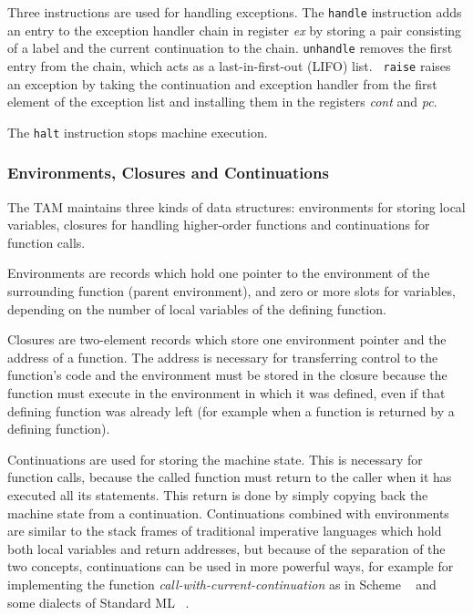 Three instructions are used for handling exceptions.  The {\tt handle}
instruction adds an entry to the exception handler chain in register
{\em ex} by storing a pair consisting of a label and the current
continuation to the chain.  {\tt unhandle} removes the first entry
from the chain, which acts as a last-in-first-out (LIFO) list.  {\tt
  raise} raises an exception by taking the continuation and exception
handler from the first element of the exception list and installing
them in the registers {\em cont} and {\em pc}.

The {\tt halt} instruction stops machine execution.

\subsubsection{Environments, Closures and Continuations}

The TAM maintains three kinds of data structures: environments for
storing local variables, closures for handling higher-order functions
and continuations for function calls.

Environments are records which hold one pointer to the environment of
the surrounding function (parent environment), and zero or more slots
for variables, depending on the number of local variables of the
defining function.

Closures are two-element records which store one environment pointer
and the address of a function.  The address is necessary for
transferring control to the function's code and the environment must
be stored in the closure because the function must execute in the
environment in which it was defined, even if that defining function
was already left (for example when a function is returned by a
defining function).

Continuations are used for storing the machine state.  This is
necessary for function calls, because the called function must return
to the caller when it has executed all its statements.  This return is
done by simply copying back the machine state from a continuation.
Continuations combined with environments are similar to the stack
frames of traditional imperative languages which hold both local
variables and return addresses, but because of the separation of the
two concepts, continuations can be used in more powerful ways, for
example for implementing the function {\em
  call-with-current-continuation}%
 as in Scheme%
~\cite{kelsey98r5rs} and
some dialects of Standard ML%
~\cite{milner97sml}.

